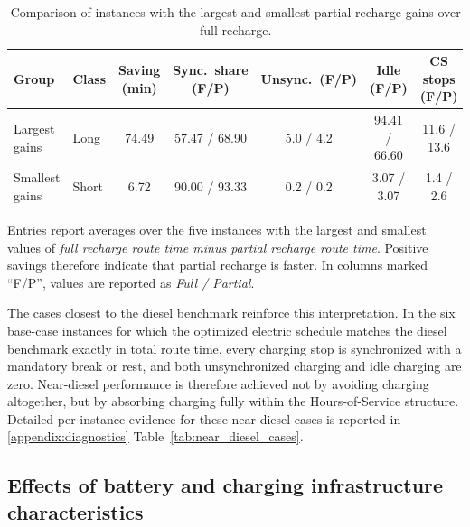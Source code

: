 \documentclass[3p,11pt,authoryear]{elsarticle}  %
\begin{document}
\begin{table}[!htbp]
\centering
\caption{Comparison of instances with the largest and smallest partial-recharge gains over full recharge.}
\label{tab:partial_full_extremes}
\begin{threeparttable}
\small
\setlength{\tabcolsep}{3.5pt}
\renewcommand{\arraystretch}{1.1}
\begin{tabular}{
p{3.0cm}
l
S[table-format=2.2]
S[table-format=2.2]
S[table-format=1.1]
S[table-format=2.2]
S[table-format=2.1]
}
\toprule
Group & Class & {Saving (min)} & {Sync.\ share (F/P)} & {Unsync.\ (F/P)} & {Idle (F/P)} & {CS stops (F/P)} \\
\midrule
Largest gains  & Long  & 74.49 & 57.47 / 68.90 & 5.0 / 4.2 & 94.41 / 66.60 & 11.6 / 13.6 \\
Smallest gains & Short & 6.72  & 90.00 / 93.33 & 0.2 / 0.2 & 3.07 / 3.07   & 1.4 / 2.6 \\
\bottomrule
\end{tabular}
\begin{tablenotes}[flushleft]
\footnotesize
\item Entries report averages over the five instances with the largest and smallest values of \emph{full recharge route time minus partial recharge route time}. Positive savings therefore indicate that partial recharge is faster. In columns marked ``F/P'', values are reported as \emph{Full / Partial}.
\end{tablenotes}
\end{threeparttable}
\end{table}

The cases closest to the diesel benchmark reinforce this interpretation. In the six base-case instances for which the optimized electric schedule matches the diesel benchmark exactly in total route time, every charging stop is synchronized with a mandatory break or rest, and both unsynchronized charging and idle charging are zero. Near-diesel performance is therefore achieved not by avoiding charging altogether, but by absorbing charging fully within the Hours-of-Service structure. Detailed per-instance evidence for these near-diesel cases is reported in \ref{appendix:diagnostics} Table~\ref{tab:near_diesel_cases}.

\subsection{Effects of battery and charging infrastructure characteristics} %
\end{document}
